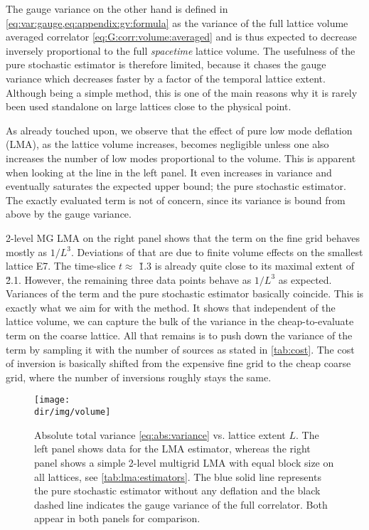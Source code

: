 The gauge variance on the other hand is defined in \cref{eq:var:gauge,eq:appendix:gv:formula} as the variance of the full lattice volume averaged correlator \cref{eq:G:corr:volume:averaged} and is thus expected to decrease inversely proportional to the full \textit{spacetime} lattice volume.
The usefulness of the pure stochastic estimator is therefore limited, because it chases the gauge variance which decreases faster by a factor of the temporal lattice extent.
Although being a simple method, this is one of the main reasons why it is rarely been used standalone on large lattices close to the physical point.

As already touched upon, we observe that the effect of pure low mode deflation (LMA), as the lattice volume increases, becomes negligible unless one also increases the number of low modes proportional to the volume.
This is apparent when looking at the  line in the left panel.
It even increases in variance and eventually saturates the expected upper bound; the pure stochastic estimator.
The exactly evaluated  term is not of concern, since its variance is bound from above by the gauge variance.

2-level MG LMA on the right panel shows that the  term on the fine grid behaves mostly as $1/L^{3}$.
Deviations of that are due to finite volume effects on the smallest lattice E7.
The time-slice $t \approx $ \u{1.3}{\femto \metre} is already quite close to its maximal extent of \u{2.1}{\femto \metre}.
However, the remaining three data points behave as $1/L^{3}$ as expected.
Variances of the  term and the pure stochastic estimator basically coincide.
This is exactly what we aim for with the method.
It shows that independent of the lattice volume, we can capture the bulk of the variance in the cheap-to-evaluate  term on the coarse lattice.
All that remains is to push down the variance of the  term by sampling it with the number of sources as stated in \cref{tab:cost}.
The cost of inversion is basically shifted from the expensive fine grid to the cheap coarse grid, where the number of inversions roughly stays the same.

\begin{figure}
\centering
\texttt{[image: \\dir/img/volume]}
\caption{
Absolute total variance \cref{eq:abs:variance} vs. lattice extent $L$.
The left panel shows data for the LMA estimator, whereas the right panel shows a simple 2-level multigrid LMA with equal block size on all lattices, see \cref{tab:lma:estimators}.
The blue solid line represents the pure stochastic estimator without any deflation and the black dashed line indicates the gauge variance of the full correlator. Both appear in both panels for comparison.
\takenfull
}
\label{fig:var:vs:volume}
\end{figure}

